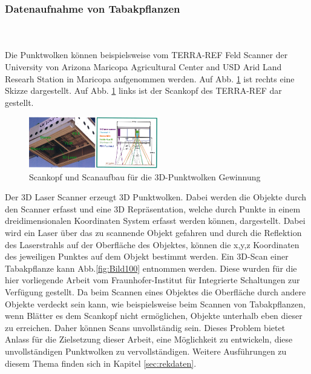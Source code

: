 \documentclass{llncs}
\begin{document}
\subsubsection{Datenaufnahme von Tabakpflanzen}
~\\\\
Die Punktwolken können beispielsweise vom TERRA-REF Feld Scanner der University von Arizona Maricopa Agricultural Center and USD Arid Land Researh Station in Maricopa aufgenommen werden. Auf Abb. \ref{fig:Bild9} ist rechts eine Skizze dargestellt. Auf Abb. \ref{fig:Bild9} links ist der Scankopf des TERRA-REF dar gestellt.
\begin{figure}[htbp] 
	\centering
	\includegraphics[width=0.5\textwidth]{lematech_2.png}
	\caption{Scankopf und Scanaufbau für die 3D-Punktwolken Gewinnung}
	\label{fig:Bild9}
\end{figure}
Der 3D Laser Scanner erzeugt 3D Punktwolken. Dabei werden die Objekte durch den Scanner erfasst und eine 3D Repräsentation, welche durch Punkte in einem dreidimensionalen Koordinaten System erfasst werden können, dargestellt. Dabei wird ein Laser über das zu scannende Objekt gefahren und durch die Reflektion des Laserstrahls auf der Oberfläche des Objektes, können die x,y,z Koordinaten des jeweiligen Punktes auf dem Objekt bestimmt werden. Ein 3D-Scan einer Tabakpflanze kann Abb.\ref{fig:Bild100} entnommen werden. Diese wurden für die hier vorliegende Arbeit vom Fraunhofer-Institut für Integrierte Schaltungen zur Verfügung gestellt. Da beim Scannen eines Objektes  die Oberfläche durch andere Objekte verdeckt sein kann, wie beispielsweise beim Scannen von Tabakpflanzen, wenn Blätter es dem Scankopf nicht ermöglichen, Objekte unterhalb eben dieser zu erreichen. Daher können Scans unvollständig sein. Dieses Problem bietet Anlass für die Zielsetzung dieser Arbeit, eine Möglichkeit zu entwickeln, diese unvollständigen Punktwolken zu vervollständigen. Weitere Ausführungen zu diesem Thema finden sich in Kapitel \ref{sec:rekdaten}. 
\end{document}
